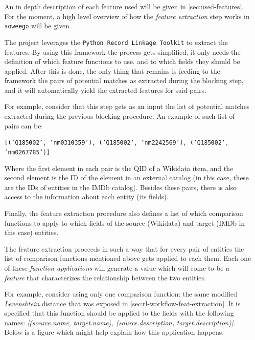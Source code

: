 \documentclass[epsfig,a4paper,11pt,titlepage,twoside,openany]{book}
\begin{document}
An in depth description of each feature used will be given in \autoref{sec:used-features}. For the moment, a high level overview of how the \textit{feature extraction} step works in \texttt{soweego} will be given. 

The project leverages the \texttt{Python Record Linkage Toolkit} \cite{recordlinkage-library} to extract the features. By using this framework the process gets simplified, it only needs the definition of which feature functions to use, and to which fields they should be applied. 
After this is done, the only thing that remains is feeding to the framework the pairs of potential matches as extracted during the blocking step, and it will automatically yield the extracted features for said pairs.

For example, consider that this step gets as an input the list of potential matches extracted during the previous blocking procedure. An example of such list of pairs can be: 

\begin{center}
    \texttt{[('Q185002', 'nm0310359'), ('Q185002', 'nm2242569'), ('Q185002', 'nm0267785')]}
\end{center}

Where the first element in each pair is the QID of a Wikidata item, and the second element is the ID of the element in an external catalog (in this case, these are the IDs of entities in the IMDb catalog). Besides these pairs, there is also access to the information about each entity (its fields). 

Finally, the feature extraction procedure also defines a list of which comparison functions to apply to which fields of the source (Wikidata) and target (IMDb in this case) entities.

The feature extraction proceeds in such a way that for every pair of entities the list of comparison functions mentioned above gets applied to each them. Each one of these \textit{function applications} will generate a value which will come to be a \textit{feature} that characterizes the relationship between the two entities.

For example, consider using only one comparison function: the same modified \textit{Levenshtein} distance that was exposed in \autoref{sec:rl-workflow-feat-extraction}. It is specified that this function should be applied to the fields with the following names: \textit{[(source.name, target.name), (source.description, target.description)]}. Below is a figure which might help explain how this application happens.
\end{document}
